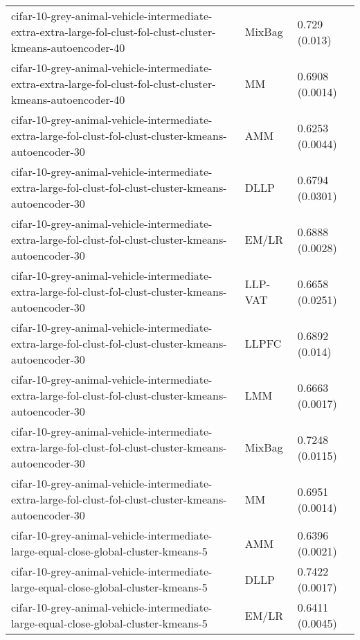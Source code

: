 \begin{longtable}{lll}
cifar-10-grey-animal-vehicle-intermediate-extra-extra-large-fol-clust-fol-clust-cluster-kmeans-autoencoder-40 &    MixBag &                             0.729 (0.013) \\
cifar-10-grey-animal-vehicle-intermediate-extra-extra-large-fol-clust-fol-clust-cluster-kmeans-autoencoder-40 &        MM &                           0.6908 (0.0014) \\
      cifar-10-grey-animal-vehicle-intermediate-extra-large-fol-clust-fol-clust-cluster-kmeans-autoencoder-30 &       AMM &                           0.6253 (0.0044) \\
      cifar-10-grey-animal-vehicle-intermediate-extra-large-fol-clust-fol-clust-cluster-kmeans-autoencoder-30 &      DLLP &                           0.6794 (0.0301) \\
      cifar-10-grey-animal-vehicle-intermediate-extra-large-fol-clust-fol-clust-cluster-kmeans-autoencoder-30 &     EM/LR &                           0.6888 (0.0028) \\
      cifar-10-grey-animal-vehicle-intermediate-extra-large-fol-clust-fol-clust-cluster-kmeans-autoencoder-30 &   LLP-VAT &                           0.6658 (0.0251) \\
      cifar-10-grey-animal-vehicle-intermediate-extra-large-fol-clust-fol-clust-cluster-kmeans-autoencoder-30 &     LLPFC &                            0.6892 (0.014) \\
      cifar-10-grey-animal-vehicle-intermediate-extra-large-fol-clust-fol-clust-cluster-kmeans-autoencoder-30 &       LMM &                           0.6663 (0.0017) \\
      cifar-10-grey-animal-vehicle-intermediate-extra-large-fol-clust-fol-clust-cluster-kmeans-autoencoder-30 &    MixBag &                           0.7248 (0.0115) \\
      cifar-10-grey-animal-vehicle-intermediate-extra-large-fol-clust-fol-clust-cluster-kmeans-autoencoder-30 &        MM &                           0.6951 (0.0014) \\
                          cifar-10-grey-animal-vehicle-intermediate-large-equal-close-global-cluster-kmeans-5 &       AMM &                           0.6396 (0.0021) \\
                          cifar-10-grey-animal-vehicle-intermediate-large-equal-close-global-cluster-kmeans-5 &      DLLP &                           0.7422 (0.0017) \\
                          cifar-10-grey-animal-vehicle-intermediate-large-equal-close-global-cluster-kmeans-5 &     EM/LR &                           0.6411 (0.0045) \\

\end{longtable}
